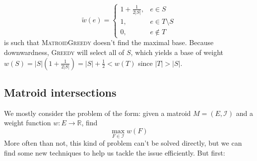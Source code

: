 \documentclass{report}
\newcommand{\RR}{\ensuremath{\mathbb{R}}}
\newcommand{\II}{\ensuremath{\mathcal{I}}}
\begin{document}
{\begin{itemize}
\begin{itemize}
          \[
            \tilde w(e) = \begin{cases}
              1 + \frac{1}{2|S|}, &e \in S \\
              1,            &e \in T \setminus S \\
              0,            &e \not\in T
            \end{cases}
          \]
          is such that \textsc{MatroidGreedy} doesn't find the maximal base. Because downwardness, \textsc{Greedy} will select all of $S$, which yields a base of weight $w(S) = |S| \left(1 + \frac{1}{2|S|}\right) = |S| + \frac{1}{2} < w(T)$ since $|T| > |S|$.
        \end{itemize}
    \end{itemize}
  }


  \subsection{Matroid intersections}

  We mostly consider the problem of the form: given a matroid $M = (E, \II)$ and a weight function $w: E \to \RR$, find \[ \max_{F \in \II} w(F) \] More often than not, this kind of problem can't be solved directly, but we can find some new techniques to help us tackle the issue efficiently. But first:
\end{document}
